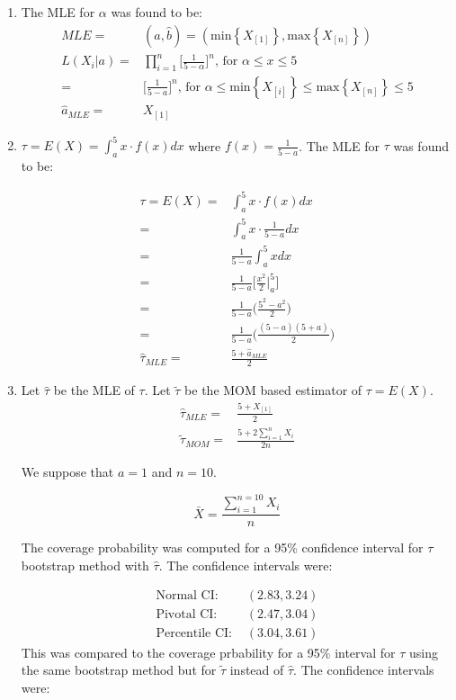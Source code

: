\documentclass[letterpaper]{article}
\begin{document}
\begin{enumerate}
\begin{enumerate}
\item The MLE for $\alpha$ was found to be:
\begin{align*}
MLE =& (\hat{a}, \hat{b}) = (\text{min}\left\{X_{[1]}\right\},\text{max}\left\{X_{[n]}\right\})\\
L(X_{i}|a) =& \prod^{n}_{i=1} \Bigg[ \frac{1}{5-\alpha}\Bigg]^{n} \text{, for } \alpha \leq x \leq 5\\
=& \Bigg[ \frac{1}{5-a} \Bigg]^{n} \text{, for } \alpha \leq \text{min}\left\{X_{[i]}\right\} \leq \text{max}\left\{X_{[n]}\right\} \leq 5\\
\hat{a}_{MLE} =& X_{[1]} 
\end{align*}

\item $\tau = E(X) = \int^{5}_{a} x \cdot f(x)dx$ where $f(x) = \frac{1}{5-a}$. The MLE for $\tau$ was found to be:

\begin{align*}
\tau = E(X) =& \int^{5}_{a} x \cdot f(x) dx \\
=& \int^{5}_{a} x \cdot \frac{1}{5-a} dx\\
=& \frac{1}{5-a} \int^{5}_{a} x dx \\
=& \frac{1}{5-a} \Bigg[ \frac{x^{2}}{2} \Bigg\vert^{5}_{a} \Bigg]\\
=& \frac{1}{5-a} \Bigg(\frac{5^{2} - a^{2} } {2} \Bigg)\\
=& \frac{1}{5-a} \Bigg(\frac{(5-a)(5+a)} {2} \Bigg)\\
\hat{\tau}_{MLE} =& \frac{5+\hat{a}_{MLE}}{2}
\end{align*}

\item Let $\hat{\tau}$ be the MLE of $\tau$. Let $\tilde{\tau}$ be the MOM based estimator of $\tau = E(X)$.
\begin{align*}
\hat{\tau}_{MLE} =& \frac{5+X_{[1]}}{2}\\
\tilde{\tau}_{MOM} =& \frac{5+2\sum^{n}_{i=1}{X_{i}}}{2n}
\end{align*}

We suppose that $a = 1$ and $n = 10$. 

$$\bar{X} = \frac{\sum^{n=10}_{i=1}{X_{i}}}{n}$$

The coverage probability was computed for a 95\% confidence interval for $\tau$ bootstrap method with $\hat{\tau}$. The confidence intervals were:

\begin{align*}
\text{Normal CI: }& (2.83,3.24)\\
\text{Pivotal CI: }& (2.47,3.04)\\
\text{Percentile CI: }& (3.04, 3.61)
\end{align*}
This was compared to the coverage prbability for a 95\% interval for $\tau$ using the same bootstrap method but for $\tilde{\tau}$ instead of $\hat{\tau}$. The confidence intervals were:


\end{enumerate}
\end{enumerate}
\end{document}
